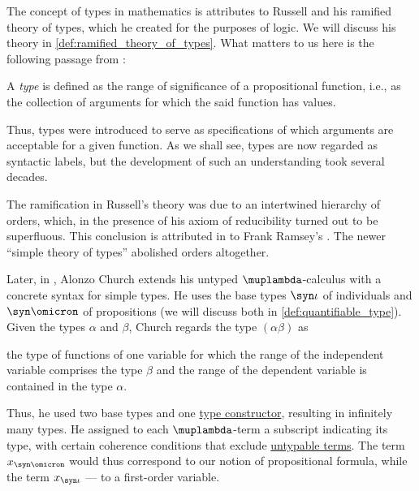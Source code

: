 \begin{remark}\label{rem:type_theory}
  The concept of types in mathematics is attributes to Russell and his ramified theory of types, which he created for the purposes of logic. We will discuss his theory in \cref{def:ramified_theory_of_types}. What matters to us here is the following passage from \cite[237]{Russell1908TypeTheory}:
  \begin{displayquote}
    A \textit{type} is defined as the range of significance of a propositional function, i.e., as the collection of arguments for which the said function has values.
  \end{displayquote}

  Thus, types were introduced to serve as specifications of which arguments are acceptable for a given function. As we shall see, types are now regarded as syntactic labels, but the development of such an understanding took several decades.

  The ramification in Russell's theory was due to an intertwined hierarchy of orders, which, in the presence of his axiom of reducibility turned out to be superfluous. This conclusion is attributed in \cite[45]{Kleene1971Metamathematics} to Frank Ramsey's \cite{Ramsey1926Foundations}. The newer \enquote{simple theory of types} abolished orders altogether.

  Later, in \cite{Church1940STT}, Alonzo Church extends his untyped \( \muplambda \)-calculus with a concrete syntax for simple types. He uses the base types \( \syn\iota \) of individuals and \( \syn\omicron \) of propositions (we will discuss both in \cref{def:quantifiable_type}). Given the types \( \alpha \) and \( \beta \), Church regards the type \( (\alpha\beta) \) as
  \begin{displayquote}
    \textellipsis the type of functions of one variable for which the range of the independent variable comprises the type \( \beta \) and the range of the dependent variable is contained in the type \( \alpha \).
  \end{displayquote}

  Thus, he used two base types and one \hyperref[con:type_constructor]{type constructor}, resulting in infinitely many types. He assigned to each \( \muplambda \)-term a subscript indicating its type, with certain coherence conditions that exclude \hyperref[def:typability]{untypable terms}. The term \( x_{\syn\omicron} \) would thus correspond to our notion of propositional formula, while the term \( x_{\syn\iota} \) --- to a first-order variable.


\end{remark}
